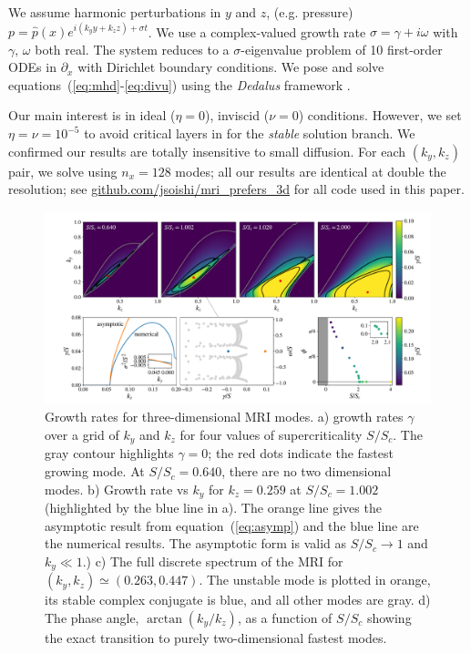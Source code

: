 \documentclass[aps,prl,reprint,superscriptaddress]{revtex4-1}
\newcommand{\SSC}{S/S_{c}}
\begin{document}
We assume harmonic perturbations in $y$ and $z$, (e.g. pressure) $p=\hat{p}(x)e^{i(k_{y}y+k_{z}z)+\sigma{t}}$. 
We use a complex-valued growth rate $\sigma=\gamma+i\omega$ with $\gamma,\,\omega$ both real. 
The system reduces to a $\sigma$-eigenvalue problem of 10 first-order ODEs in $\partial_{x}$ with Dirichlet boundary conditions.
We pose and solve equations~(\ref{eq:mhd}-\ref{eq:divu}) using the \emph{Dedalus} framework \citep{The Dedalus paper}. 

Our main interest is in ideal ($\eta=0$), inviscid ($\nu=0$) conditions.
However, we set $\eta=\nu=10^{-5}$ to avoid critical layers in for the \textit{stable} solution branch.
We confirmed our results are totally insensitive to small diffusion. 
For each $(k_{y},k_{z})$ pair, we solve using $n_{x}=128$ modes; all our results are identical at double the resolution; see \protect\url{github.com/jsoishi/mri_prefers_3d} for all code used in this paper.
\begin{figure}[ht]
  \includegraphics[width=\textwidth]{fig_1.pdf}
  \caption{Growth rates for three-dimensional MRI modes. 
  a) growth rates $\gamma$ over a grid of $k_{y}$ and $k_{z}$ for four values of supercriticality $\SSC$. 
  The gray contour highlights $\gamma=0$; the red dots indicate the fastest growing mode. 
  At $\SSC=0.640$, there are no two dimensional modes. 
  b) Growth rate vs $k_{y}$ for $k_{z}=0.259$ at $\SSC=1.002$ (highlighted by the blue line in a). 
  The orange line gives the asymptotic result from equation~(\ref{eq:asymp}) and the blue line are the numerical results. 
  The asymptotic form is valid as $\SSC\to1$ and $k_{y}\ll1$.) c) The full discrete spectrum of the MRI for $(k_{y},k_{z})\simeq(0.263,0.447)$. 
  The unstable mode is plotted in orange, its stable complex conjugate is blue, and all other modes are gray. 
  d) The phase angle, $\arctan(k_{y}/k_{z})$, as a function of $\SSC$ showing the exact transition to purely two-dimensional fastest modes.}
  \label{fig:growth_rate}
\end{figure}
\end{document}
